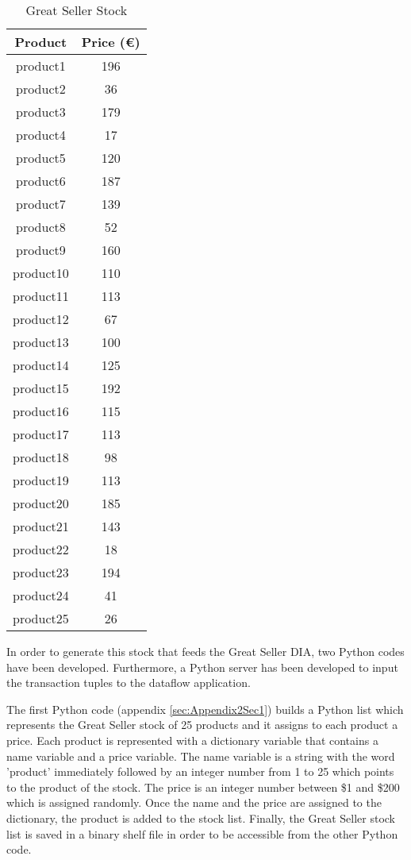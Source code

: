 \begin{table}[h!]
\centering
	\begin{tabular}{||c|c||} 
	\hline\hline
	Product & Price (\euro{}) \\ [1ex] 
	\hline\hline
	product1 & 196 \\ 
	\hline
	product2 & 36 \\ 
	\hline
	product3 & 179 \\ 
	\hline
	product4 & 17 \\ 
	\hline
	product5 & 120 \\ 
	\hline
	product6 & 187 \\ 
	\hline
	product7 & 139 \\ 
	\hline
	product8 & 52 \\ 
	\hline
	product9 & 160 \\ 
	\hline
	product10 & 110 \\ 
	\hline
	product11 & 113 \\ 
	\hline
	product12 & 67 \\ 
	\hline
	product13 & 100 \\ 
	\hline
	product14 & 125 \\ 
	\hline
	product15 & 192 \\ 
	\hline
	product16 & 115 \\ 
	\hline
	product17 & 113 \\ 
	\hline
	product18 & 98 \\ 
	\hline
	product19 & 113 \\ 
	\hline
	product20 & 185 \\ 
	\hline
	product21 & 143 \\ 
	\hline
	product22 & 18 \\ 
	\hline
	product23 & 194 \\ 
	\hline
	product24 & 41 \\ 
	\hline
	product25 & 26 \\ 
	\hline\hline
	\end{tabular}
\caption{Great Seller Stock}
\label{Great Seller Stock}
\end{table}

In order to generate this stock that feeds the Great Seller DIA, two Python codes have been developed. Furthermore, a Python server has been developed to input the transaction tuples to the dataflow application.

The first Python code (appendix \ref{sec:Appendix2Sec1}) builds a Python list which represents the Great Seller stock of 25 products and it assigns to each product a price. Each product is represented with a dictionary variable that contains a name variable and a price variable. The name variable is a string with the word 'product' immediately followed by an integer number from 1 to 25 which points to the product of the stock. The price is an integer number between \$1 and \$200 which is assigned randomly. Once the name and the price are assigned to the dictionary, the product is added to the stock list. Finally, the Great Seller stock list is saved in a binary shelf file in order to be accessible from the other Python code.


